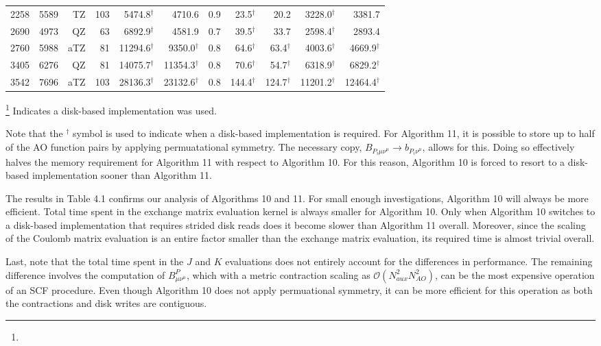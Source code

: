 \begin{table}[H]
\begin{tabular}{lrrrrrrrrrr}
2258& 5589&    TZ&   103&  5474.8$^{\dagger}$ &             4710.6&     0.9 &   23.5$^{\dagger}$ &               20.2&  3228.0$^{\dagger}$&              3381.7\\
2690& 4973&    QZ&    63&  6892.9$^{\dagger}$ &             4581.9&     0.7 &   39.5$^{\dagger}$ &               33.7&  2598.4$^{\dagger}$&              2893.4\\
2760& 5988&   aTZ&    81& 11294.6$^{\dagger}$ & 9350.0$^{\dagger}$&     0.8 &   64.6$^{\dagger}$ &   63.4$^{\dagger}$&  4003.6$^{\dagger}$&  4669.9$^{\dagger}$\\
3405& 6276&    QZ&    81& 14075.7$^{\dagger}$ &11354.3$^{\dagger}$&     0.8 &   70.6$^{\dagger}$ &   54.7$^{\dagger}$&  6318.9$^{\dagger}$&  6829.2$^{\dagger}$\\
3542& 7696&   aTZ&   103& 28136.3$^{\dagger}$ &23132.6$^{\dagger}$&     0.8 &  144.4$^{\dagger}$ &  124.7$^{\dagger}$& 11201.2$^{\dagger}$& 12464.4$^{\dagger}$\\

\hline
\end{tabular}
\renewcommand{\thefootnote}{\fnsymbol{footnote}}
\footnote[2]{} Indicates a disk-based implementation was used.
\end{table}
\endgroup

Note that the $^{\dagger}$ symbol is used to indicate when a disk-based implementation is required. For Algorithm 11, it is possible
to store up to half of the AO function pairs by applying permuatational symmetry. The necessary copy, 
$B_{P_i \mu \nu^{\mu}} \rightarrow b_{P_i \nu^{\mu}}$, allows for this. Doing so effectively halves the memory requirement for Algorithm 11
with respect to Algorithm 10. For this reason, Algorithm 10 is forced to resort to a disk-based implementation sooner than Algorithm 11.

The results in Table 4.1 confirms our analysis of Algorithms 10 and 11. For small enough investigations, Algorithm 10 will always be more
efficient. Total time spent in the exchange matrix evaluation kernel is always smaller for Algorithm 10. Only when Algorithm 10 switches to 
a disk-based implementation that requires strided disk reads does it become slower than Algorithm 11 overall. Moreover, since the scaling of
the Coulomb matrix evaluation is an entire factor smaller than the exchange matrix evaluation, its required time is almost trivial overall.

Last, note that the total time spent in the $J$ and $K$ evaluations does not entirely account for the differences in performance. The 
remaining difference involves the computation of $B^P_{\mu \nu^\mu}$, which with a metric contraction scaling as 
$\mathcal{O}(N_{aux}^2N_{AO}^2)$, can be the most expensive operation of an SCF procedure. Even though Algorithm 10 does not 
apply permuational symmetry, it can be more efficient for this operation as both the contractions and disk writes are contiguous.
 



